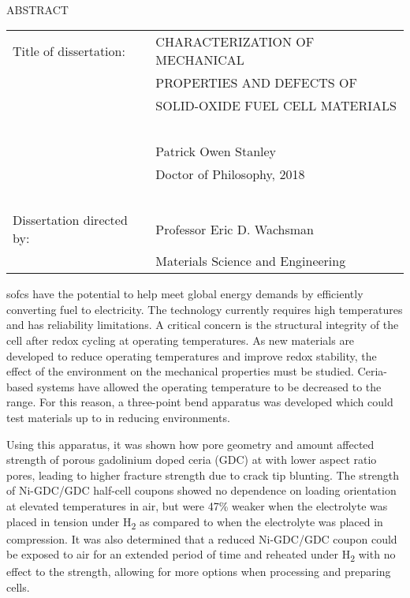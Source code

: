 
\hbox{\ }

\renewcommand{\baselinestretch}{1}
\small \normalsize

\begin{center}
\large{{ABSTRACT}}

\vspace{3em}

\end{center}
\hspace{-.15in}
\begin{tabular}{ll}
Title of dissertation:    & {\large  CHARACTERIZATION OF MECHANICAL}\\
&				      {\large  PROPERTIES AND DEFECTS OF  } \\
&				      {\large  SOLID-OXIDE FUEL CELL MATERIALS } \\
\ \\
&                          {\large  Patrick Owen Stanley} \\
&                           {\large Doctor of Philosophy, 2018}\\
\ \\
Dissertation directed by: & {\large  Professor Eric D. Wachsman} \\
&  				{\large	 Materials Science and Engineering } \\
\end{tabular}

\vspace{3em}

\renewcommand{\baselinestretch}{2}
\large \normalsize


\Glspl{sofc} have the potential to help meet global energy demands by efficiently converting fuel to electricity.
The technology currently requires high temperatures and has reliability limitations.
A critical concern is the structural integrity of the cell after redox cycling at operating temperatures.
As new materials are developed to reduce operating temperatures and improve redox stability, the effect of the environment on the mechanical properties must be studied.
Ceria-based systems have allowed the operating temperature to be decreased to the  range.
For this reason, a three-point bend apparatus was developed which could test materials up to  in reducing environments.

Using this apparatus, it was shown how pore geometry and amount affected strength of porous gadolinium doped ceria (GDC) at  with lower aspect ratio pores, leading to higher fracture strength due to crack tip blunting.
The strength of Ni-GDC/GDC half-cell coupons showed no dependence on loading orientation at elevated temperatures in air, but were 47\% weaker when the electrolyte was placed in tension under H\textsubscript{2} as compared to when the electrolyte was placed in compression.
It was also determined that a reduced Ni-GDC/GDC coupon could be exposed to air for an extended period of time and reheated under H\textsubscript{2} with no effect to the strength, allowing for more options when processing and preparing cells.

